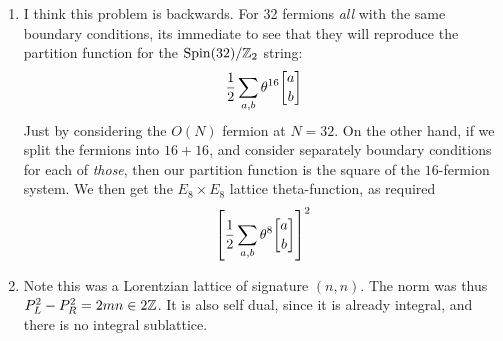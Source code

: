 \documentclass[11pt, class=article, crop=false]{standalone}
\begin{document}
\begin{enumerate}
	\item I think this problem is backwards. For 32 fermions \emph{all} with the same boundary conditions, its immediate to see that they will reproduce the partition function for the $\mathrm{Spin}(32)/\mathbb{Z}_2$ string:
	\[
		\frac12 \sum_{a,b} \theta^{16}\twist ab
	\]
	Just by considering the $O(N)$ fermion at $N=32$. On the other hand, if we split the fermions into $16+16$, and consider separately boundary conditions for each of \emph{those}, then our partition function is the square of the $16$-fermion system. We then get the $E_8 \times E_8$ lattice theta-function, as required
	\[
		\left[ \frac12 \sum_{a,b} \theta^{8}\twist ab \right]^2
	\]
	\item Note this was a Lorentzian lattice of signature $(n,n)$. The norm was thus $P_L^2 - P_R^2 = 2 m n \in 2 \mathbb{Z}$. It is also self dual, since it is already integral, and there is no integral sublattice. 
	

\end{enumerate}
\end{document}
